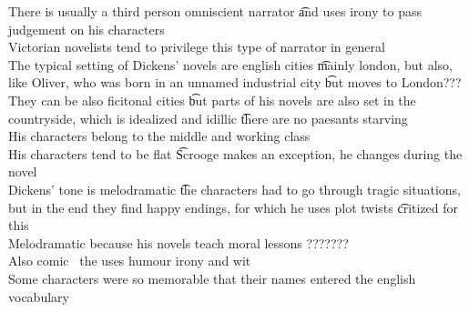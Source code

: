 \documentclass[12pt]{article}
\begin{document}
There is usually a third person omniscient narrator \t and uses irony to pass judgement on his characters \\
Victorian novelists tend to privilege this type of narrator in general \\
The typical setting of Dickens' novels are english cities \t mainly london, but also, like Oliver, who was born in an unnamed industrial city \t but moves to London??? \\
They can be also ficitonal cities \t but parts of his novels are also set in the countryside, which is idealized and idillic \t there are no paesants starving \\
His characters belong to the middle and working class \\
His characters tend to be flat \t Scrooge makes an exception, he changes during the novel \\
Dickens' tone is melodramatic \t the characters had to go through tragic situations, but in the end they find happy endings, for which he uses plot twists \t critized for this \\
Melodramatic because his novels teach moral lessons ??????? \\
Also comic \ the uses humour irony and wit \\
Some characters were so memorable that their names entered the english vocabulary
\end{document}
